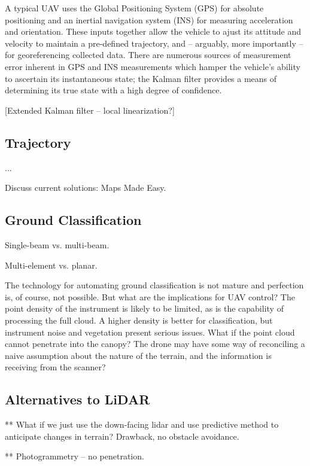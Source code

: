 \documentclass[10pt,a4paper]{report}
\begin{document}
A typical UAV uses the Global Positioning System (GPS) for absolute positioning and an inertial navigation system (INS) for measuring acceleration and orientation. These inputs together allow the vehicle to ajust its attitude and velocity to maintain a pre-defined trajectory, and -- arguably, more importantly -- for georeferencing collected data. There are numerous sources of measurement error inherent in GPS and INS measurements which hamper the vehicle's ability to ascertain its instantaneous state; the Kalman filter provides a means of determining its true state with a high degree of confidence.

[Extended Kalman filter -- local linearization?]

\subsection{Trajectory}

...

Discuss current solutions: Maps Made Easy.



\subsection{Ground Classification}

Single-beam vs. multi-beam.

Multi-element vs. planar. \cite{Nobili2015}

The technology for automating ground classification is not mature \cite{Vosselman2001,Vosselman2000} and perfection is, of course, not possible. But what are the implications for UAV control? The point density of the instrument is likely to be limited, as is the capability of processing the full cloud. A higher density is better for classification, but instrument noise and vegetation present serious issues. What if the point cloud cannot penetrate into the canopy? The drone may have some way of reconciling a naive assumption about the nature of the terrain, and the information is receiving from the scanner?


\subsection{Alternatives to LiDAR}

** What if we just use the down-facing lidar and use predictive method to anticipate changes in terrain? Drawback, no obstacle avoidance.

** Photogrammetry -- no penetration.
\end{document}
